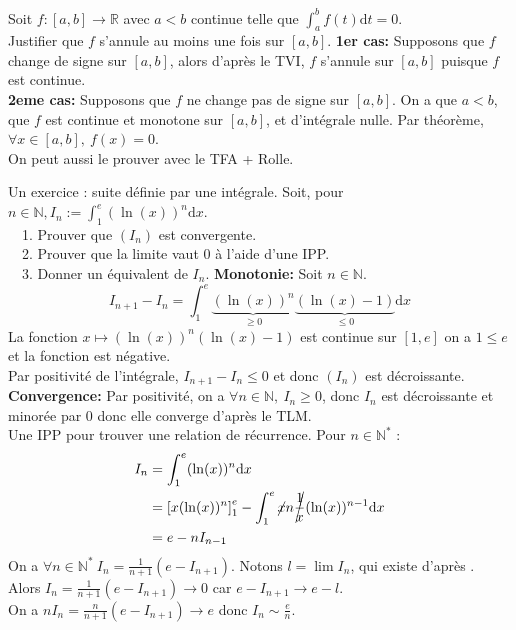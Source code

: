 \documentclass[11pt]{article}
\newcommand*{\R}{\mathbb{R}}
\newcommand*{\N}{\mathbb{N}}
\newcommand{\0}{\varnothing}
\newcommand*{\n}{\\[0.2cm]}
\newcommand{\dx}{\textrm{d}x}
\newcommand{\dt}{\textrm{d}t}
\begin{document}
\begin{ex}{}{}
    Soit $f:[a,b]\to\R$ avec $a<b$ continue telle que $\int_a^bf(t)\dt=0$.\\
    Justifier que $f$ s'annule au moins une fois sur $[a,b]$.
    \tcblower
    \textbf{1er cas:} Supposons que $f$ change de signe sur $[a,b]$, alors d'après le TVI, $f$ s'annule sur $[a,b]$ puisque $f$ est continue.\\
    \textbf{2eme cas:} Supposons que $f$ ne change pas de signe sur $[a,b]$. On a que $a<b$, que $f$ est continue et monotone sur $[a,b]$, et d'intégrale nulle. Par théorème, $\forall x \in [a,b], ~ f(x)=0$.\n
    On peut aussi le prouver avec le TFA + Rolle.
\end{ex}

\begin{ex}{Un exercice : suite définie par une intégrale.}{}
    Soit, pour $n\in\N, I_n := \int_1^e(\ln(x))^n\dx$.\\
    \-\ ~1. Prouver que $(I_n)$ est convergente.\\
    \-\ ~2. Prouver que la limite vaut 0 à l'aide d'une IPP.\\
    \-\ ~3. Donner un équivalent de $I_n$.
    \tcblower
     \textbf{Monotonie:} Soit $n\in\N$.
    \begin{equation*}
        I_{n+1} - I_n = \int_1^e\underbrace{(\ln(x))^n}_{\geq0}\underbrace{(\ln(x)-1)}_{\leq0}\dx
    \end{equation*}
    La fonction $x\mapsto (\ln(x))^n(\ln(x)-1)$ est continue sur $[1,e]$ on a $1\leq e$ et la fonction est négative.\\
    Par positivité de l'intégrale, $I_{n+1}-I_n\leq0$ et donc $(I_n)$ est décroissante.\\
    \textbf{Convergence:} Par positivité, on a $\forall n \in \N, ~ I_n \geq 0$, donc $I_n$ est décroissante et minorée par $0$ donc elle converge d'après le TLM.\\
     Une IPP pour trouver une relation de récurrence. Pour $n\in \N^*$ :
    \begin{align*}
        I_n &= \int_1^e(\ln(x))^n\dx\\&=\left[ x(\ln(x))^n \right]_1^e - \int_1^e\cancel{x}n\cancel{\frac{1}{x}}(\ln(x))^{n-1}\dx\\&=e-nI_{n-1}
    \end{align*}
    On a $\forall n \in \N^* ~ I_{n} = \frac{1}{n+1}(e-I_{n+1})$. Notons $l=\lim I_n$, qui existe d'après .\\
    Alors $I_n = \frac{1}{n+1}(e-I_{n+1})\to0$ car $e-I_{n+1}\to e - l$.\\
     On a $nI_n = \frac{n}{n+1}(e-I_{n+1})\to e$ donc $I_n \sim \frac{e}{n}$.
\end{ex}
\end{document}
